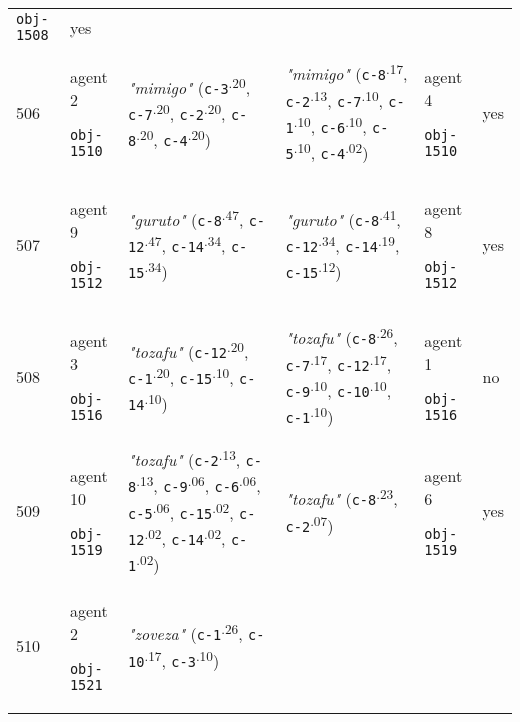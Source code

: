 {\begin{tabular}{@{}p{0.3cm}p{0.9cm}p{6cm}p{6cm}p{0.9cm}p{0.55cm}@{}}
 \texttt{obj-1508} & yes \\
506 & agent 2 

\texttt{obj-1510} &\textit{"mimigo"} (\texttt{c-3}\textsuperscript{.20}, \texttt{c-7}\textsuperscript{.20}, \texttt{c-2}\textsuperscript{.20}, \texttt{c-8}\textsuperscript{.20}, \texttt{c-4}\textsuperscript{.20}) & \textit{"mimigo"} (\texttt{c-8}\textsuperscript{.17}, \texttt{c-2}\textsuperscript{.13}, \texttt{c-7}\textsuperscript{.10}, \texttt{c-1}\textsuperscript{.10}, \texttt{c-6}\textsuperscript{.10}, \texttt{c-5}\textsuperscript{.10}, \texttt{c-4}\textsuperscript{.02}) & agent 4 

 \texttt{obj-1510} & yes \\
507 & agent 9 

\texttt{obj-1512} &\textit{"guruto"} (\texttt{c-8}\textsuperscript{.47}, \texttt{c-12}\textsuperscript{.47}, \texttt{c-14}\textsuperscript{.34}, \texttt{c-15}\textsuperscript{.34}) & \textit{"guruto"} (\texttt{c-8}\textsuperscript{.41}, \texttt{c-12}\textsuperscript{.34}, \texttt{c-14}\textsuperscript{.19}, \texttt{c-15}\textsuperscript{.12}) & agent 8 

 \texttt{obj-1512} & yes \\
508 & agent 3 

\texttt{obj-1516} &\textit{"tozafu"} (\texttt{c-12}\textsuperscript{.20}, \texttt{c-1}\textsuperscript{.20}, \texttt{c-15}\textsuperscript{.10}, \texttt{c-14}\textsuperscript{.10}) & \textit{"tozafu"} (\texttt{c-8}\textsuperscript{.26}, \texttt{c-7}\textsuperscript{.17}, \texttt{c-12}\textsuperscript{.17}, \texttt{c-9}\textsuperscript{.10}, \texttt{c-10}\textsuperscript{.10}, \texttt{c-1}\textsuperscript{.10}) & agent 1 

 \texttt{obj-1516} & no \\
509 & agent 10 

\texttt{obj-1519} &\textit{"tozafu"} (\texttt{c-2}\textsuperscript{.13}, \texttt{c-8}\textsuperscript{.13}, \texttt{c-9}\textsuperscript{.06}, \texttt{c-6}\textsuperscript{.06}, \texttt{c-5}\textsuperscript{.06}, \texttt{c-15}\textsuperscript{.02}, \texttt{c-12}\textsuperscript{.02}, \texttt{c-14}\textsuperscript{.02}, \texttt{c-1}\textsuperscript{.02}) & \textit{"tozafu"} (\texttt{c-8}\textsuperscript{.23}, \texttt{c-2}\textsuperscript{.07}) & agent 6 

 \texttt{obj-1519} & yes \\
510 & agent 2 

\texttt{obj-1521} &\textit{"zoveza"} (\texttt{c-1}\textsuperscript{.26}, \texttt{c-10}\textsuperscript{.17}, \texttt{c-3}\textsuperscript{.10})


\end{tabular}}
